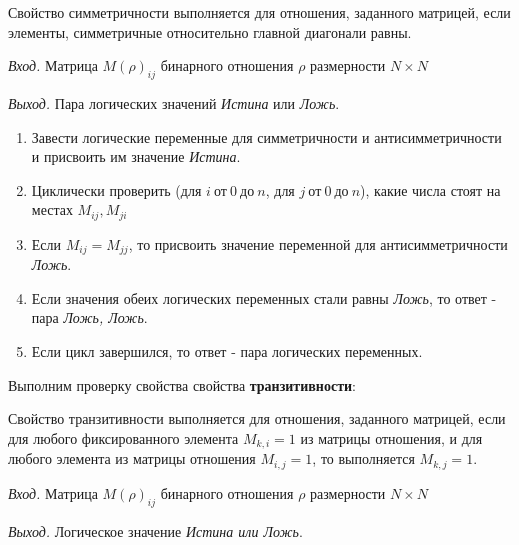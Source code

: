 \documentclass[bachelor, och, labwork]{shiza}
\begin{document}
Свойство симметричности выполняется для отношения, заданного матрицей, если
элементы, симметричные относительно главной диагонали равны.

\textit{Вход.} Матрица $M(\rho)_{ij}$ бинарного отношения $\rho$ размерности
$N \times N$

\textit{Выход.} Пара логических значений \textit{Истина} или \textit{Ложь}.

\begin{enumerate}
    
    \item Завести логические переменные для симметричности и антисимметричности 
    и присвоить им значение \textit{Истина}.

    \item Циклически проверить (для $i ~\text{от}~ 0 ~\text{до}~ n$, 
    для $j ~\text{от}~ 0 ~\text{до}~ n$), какие числа стоят на местах $M_{ij},M_{ji}$

    \item Если $M_{ij} = M_{jj}$, то присвоить значение переменной для
    антисимметричности \textit{Ложь}.
    
    \item Если значения обеих логических переменных стали равны \textit{Ложь}, то
    ответ - пара \textit{Ложь, Ложь}.
    
    \item Если цикл завершился, то ответ - пара логических переменных.

\end{enumerate}

Выполним проверку свойства свойства \textbf{транзитивности}:

Свойство транзитивности выполняется для отношения, заданного матрицей, если для 
любого фиксированного элемента $M_{k,i}=1$ из матрицы отношения, и для любого
элемента из матрицы отношения $M_{i,j}=1$, то выполняется $M_{k,j}=1$.

\textit{Вход.} Матрица $M(\rho)_{ij}$ бинарного отношения $\rho$ размерности
$N \times N$

\textit{Выход.} Логическое значение \textit{Истина или Ложь}.
\end{document}
